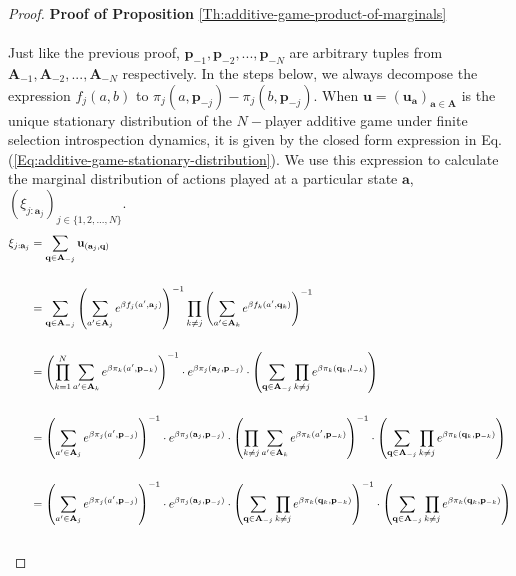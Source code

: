 \documentclass[11pt]{article}
\theoremstyle{plainCl1}
\theoremstyle{plainCl2}
\newcommand{\A}{\mathbf{A}}
\newcommand{\abf}{\mathbf{a}}
\newcommand{\qbf}{\mathbf{q}}
\newcommand{\pbf}{\mathbf{p}}
\newcommand{\ubf}{\mathbf{u}}
\begin{document}
\begin{proof}
\textbf{Proof of Proposition} \ref{Th:additive-game-product-of-marginals} \\ \\ 
Just like the previous proof, $\pbf_{-1}, \pbf_{-2},...,\pbf_{-N} $ are arbitrary tuples from $\A_{-1}, \A_{-2},...,\A_{-N}$ respectively. In the steps below, we always decompose the expression $f_j(a,b)$ to $\pi_j(a,\pbf_{-j}) - \pi_j(b,\pbf_{-j})$. When $\ubf = (\ubf_\abf)_{\abf \in \A}$ is the unique stationary distribution of the $N-$player additive game under finite selection introspection dynamics, it is given by the closed form expression in Eq. (\ref{Eq:additive-game-stationary-distribution}). We use this expression to calculate the marginal distribution of actions played at a particular state $\abf$, $(\xi_{j:\abf_j})_{j \in \{1,2,...,N\}}$. 
\begin{align}
\xi_{j:\abf_j} &= \sum_{\qbf \in \A_{-j}} \ubf_{(\abf_j,\qbf)} \\ \notag \\
&= \sum_{\qbf \in \A_{-j}} \left( \sum_{a' \in \A_j} \displaystyle e^{\beta f_j(a',\abf_j)}\right)^{-1} \prod_{k \neq j} \left( \sum_{a' \in \A_k} \displaystyle e^{\beta f_k(a',\qbf_k)}\right)^{-1} \\ \notag \\
&= \left( \prod_{k=1}^N \sum_{a' \in \A_k} \displaystyle e^{\beta \pi_k (a', \pbf_{-k})}\right)^{-1} \cdot \displaystyle e^{\beta \pi_j(\abf_j, \pbf_{-j})} \cdot \left( \sum_{\qbf \in \A_{-j}} \prod_{k \neq j} e^{\beta \pi_k(\qbf_k, l_{-k})} \right) \\ \notag \\
\label{step-prod-sum}
&= \left( \sum_{a' \in \A_j} \displaystyle e^{\beta \pi_j(a',\pbf_{-j})}\right)^{-1} \cdot \displaystyle e^{\beta \pi_j(\abf_j, \pbf_{-j})}\cdot \left( \prod_{k\neq j} \sum_{a' \in \A_k} \displaystyle e^{\beta \pi_k(a',\pbf_{-k})}\right)^{-1} \cdot \left( \sum_{\qbf \in \A_{-j}} \prod_{k \neq j} e^{\beta \pi_k(\qbf_k,\pbf_{-k})} \right) \\ \notag \\ 
\label{step-sum-prod}
&= \left( \sum_{a' \in \A_j} \displaystyle e^{\beta \pi_j(a',\pbf_{-j})}\right)^{-1} \cdot \displaystyle e^{\beta \pi_j(\abf_j, \pbf_{-j})}\cdot \left( \sum_{\qbf \in \A_{-j}} \prod_{k\neq j}  \displaystyle e^{\beta \pi_k(\qbf_k,\pbf_{-k})} \right)^{-1} \cdot \left( \sum_{\qbf \in \A_{-j}} \prod_{k \neq j} e^{\beta \pi_k(\qbf_k,\pbf_{-k})}  \right) \\ \notag \\ 

\end{align}
\end{proof}
\end{document}
